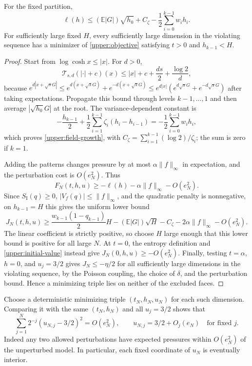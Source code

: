 \begin{lemma}
\label{upper:coercive}
For the fixed partition,
\begin{equation}
\label{upper:field-growth}
 \ell(h)\le (\mathbb E|G|)\sqrt{h_0}+C_{\zeta}
                   -\frac12\sum_{i=0}^{k-1}w_ih_i.
\end{equation}
For sufficiently large fixed $H$, every sufficiently large
dimension in the violating sequence has a minimizer of
\eqref{upper:objective} satisfying
$t>0$ and $h_{k-1}<H$.
\end{lemma}

\begin{proof}
Start from $\log\cosh x\le|x|$. For $d>0$,
\[
 \mathcal T_{s,d}(|\cdot|+c)(x)
 \le |x|+c+\frac{ds}{2}+\frac{\log2}{d},
\]
because $e^{d|x+\sqrt sG|}\le
e^{d(x+\sqrt sG)}+e^{-d(x+\sqrt sG)}
\le e^{d|x|}(e^{d\sqrt sG}+e^{-d\sqrt sG})$ after
taking expectations. Propagate this bound through levels
$k-1,\ldots,1$ and then average $|\sqrt{h_0}G|$ at the
root. The variance-dependent constant is
\[
 -\frac{h_{k-1}}2
 +\frac12\sum_{i=1}^{k-1}\zeta_i(h_i-h_{i-1})
 =-\frac12\sum_{i=0}^{k-1}w_ih_i,
\]
which proves \eqref{upper:field-growth}, with
$C_\zeta=\sum_{i=1}^{k-1}(\log2)/\zeta_i$; the sum is
zero if $k=1$.

Adding the patterns changes pressure by at most
$\alpha\|f\|_\infty$ in expectation, and the perturbation
cost is $O(e_N^2)$. Thus
\[
 F_N(t,h,u)\ge-\ell(h)-\alpha\|f\|_\infty-O(e_N^2).
\]
Since $S_{\mathrm I}(q)\ge0$, $|V_f(q)|\le\|f\|_\infty$,
and the quadratic penalty is nonnegative, on $h_{k-1}=H$
this gives the uniform lower bound
\begin{equation}
\label{upper:cap-bound}
 J_N(t,h,u)\ge
 \frac{w_{k-1}(1-q_{k-1})}{2}H
 -(\mathbb E|G|)\sqrt H-C_\zeta
 -2\alpha\|f\|_\infty-O(e_N^2).
\end{equation}
The linear coefficient is strictly positive, so choose $H$
large enough that this lower bound is positive for all large
$N$. At $t=0$, the entropy definition and
\eqref{upper:initial-value} instead give
$J_N(0,h,u)\ge-O(e_N^2)$.
Finally, testing $t=\alpha$, $h=0$, and $u_j=3/2$ gives
$J_N\le-\eta/2$ for all sufficiently large dimensions in
the violating sequence, by the Poisson coupling, the choice
of $\delta$, and the perturbation bound. Hence a minimizing
triple lies on neither of the excluded faces.
\end{proof}

Choose a deterministic minimizing triple $(t_N,h_N,u_N)$
for each such dimension. Comparing it with the same $(t_N,h_N)$
and all $u_j=3/2$ shows that
\begin{equation}
\label{upper:penalty}
 \sum_{j=1}^N2^{-j}(u_{N,j}-3/2)^2=O(e_N^2),
 \qquad u_{N,j}=3/2+O_j(e_N)\quad\text{for fixed }j.
\end{equation}
Indeed any two allowed perturbations have expected pressures
within $O(e_N^2)$ of the unperturbed model. In particular,
each fixed coordinate of $u_N$ is eventually interior.

